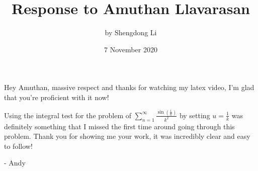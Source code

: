 \documentclass[12pt]{article}
\begin{document}
\title{Response to Amuthan Llavarasan}
\author{by Shengdong Li}
\date{7 November 2020}
\maketitle

Hey Amuthan, massive respect and thanks for watching my latex video, I'm glad that you're proficient with it now!

Using the integral test for the problem of $\sum_{n=1}^{\infty}\frac{\sin\left(\frac{1}{k}\right)}{k^{2}}$ by setting $u=\frac{1}{k}$ was definitely something that I missed the first time around going through this problem. Thank you for showing me your work, it was incredibly clear and easy to follow!

\bigskip

- Andy
\end{document}
